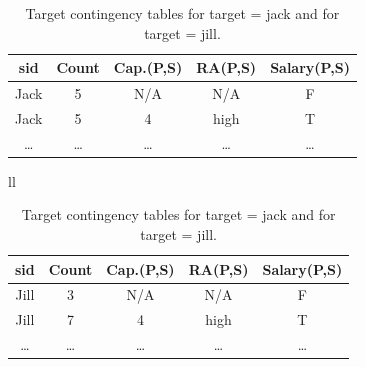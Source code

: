 \begin{table}[htbp] 
\centering
\caption{Target contingency tables for target = jack and for target = jill.}

  \begin{tabular}{|c|c|c|c|c|} \hline
    \textbf{sid}   & \textbf{Count} &\textbf{ Cap.(P,S)} & \textbf{RA(P,S)} & \textbf{Salary(P,S)} \\  \hline
    Jack  & 5     & N/A   & N/A   & F \\ \hline
    Jack  & 5     & 4     & high  & T \\ \hline
    \dots    &  \dots      &  \dots     & \dots      & \dots   \\ \hline
    \end{tabular}%

\bigskip

\begin{tabular}{ll}
  \begin{tabular}{|c|c|c|c|c|} \hline
    \textbf{sid}   & \textbf{Count} &\textbf{ Cap.(P,S)} & \textbf{RA(P,S)} & \textbf{Salary(P,S)} \\  \hline
    Jill  & 3     & N/A   & N/A   & F \\ \hline
    Jill  & 7     & 4     & high  & T \\ \hline
    \dots    &  \dots      &  \dots     & \dots      & \dots   \\ \hline
    \end{tabular}%
\end{tabular}

 \label{table:targetct}
\end{table}




